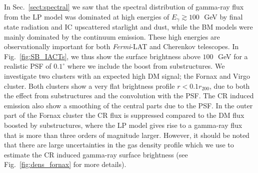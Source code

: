 \documentclass[10pt,aps,pra,reprint,amsmath,amsfonts,amssymb,showpacs,nofootinbib,floatfix]{revtex4-1}
\newcommand{\Fermi}{{\em Fermi}\xspace}
\newcommand{\degs}{^\circ}
\newcommand{\rvir}{r_{200}}
\begin{document}
In Sec.~\ref{sect:spectral} we saw that the spectral distribution of
gamma-ray flux from the LP model was dominated at high energies of
$E_\gamma\gtrsim 100\,$~GeV by final state radiation and IC upscattered
starlight and dust, while the BM models were mainly dominated by the
continuum emission. These high energies are observationally important
for both \Fermi-LAT and Cherenkov telescopes. In
Fig.~\ref{fig:SB_IACTs}, we thus show the surface brightness above
$100\,$~GeV for a realistic PSF of $0.1\degs$ where we include the
boost from substructures. We investigate two clusters with an expected
high DM signal; the Fornax and Virgo cluster. Both clusters show a
very flat brightness profile $r<0.1\rvir$, due to both the effect from
substructures and the convolution with the PSF. The CR induced emission
also show a smoothing of the central parts due to the PSF. In the
outer part of the Fornax cluster the CR flux is suppressed compared to
the DM flux boosted by substructures, where the LP model gives rise to
a gamma-ray flux that is more than three orders of magnitude
larger. However, it should be noted that there are large uncertainties
in the gas density profile which we use to estimate the CR induced
gamma-ray surface brightness (see Fig.~\ref{fig:dens_fornax} for more
details).
\end{document}
